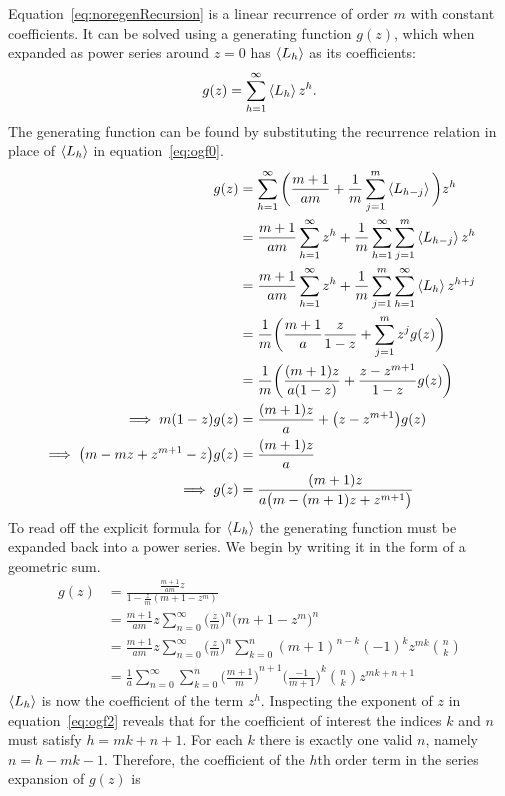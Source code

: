 Equation~\ref{eq:noregenRecursion} is a linear recurrence of order $m$ with constant coefficients. It can be solved using a generating function $g(z)$, which when expanded as power series around $z=0$ has $\left\langle L_h \right\rangle$ as its coefficients:
\begin{align}
	g(z) = \sum_{h=1}^{\infty} \left\langle L_h \right\rangle z^h\label{eq:ogf0}.
\end{align}
The generating function can be found by substituting the recurrence relation in place of $\left\langle L_h \right\rangle$ in equation~\ref{eq:ogf0}.
\begin{align}
	g(z)
		&= \sum_{h=1}^\infty\bigg(\frac{m+1}{am} + \frac{1}{m}\sum_{j=1}^m \left\langle L_{h-j} \right\rangle\bigg)z^h\nonumber\\
		&= \frac{m+1}{am}\sum_{h=1}^\infty z^h + \frac{1}{m} \sum_{h=1}^\infty\sum_{j=1}^m \left\langle L_{h-j} \right\rangle z^h \nonumber\\
		&= \frac{m+1}{am}\sum_{h=1}^\infty z^h + \frac{1}{m} \sum_{j=1}^m\sum_{h=1}^\infty \left\langle L_h \right\rangle z^{h+j} \nonumber\\
		&= \frac{1}{m}\bigg(\frac{m+1}{a}\frac{z}{1-z} + \sum_{j=1}^m z^j g(z)\bigg)\nonumber\\
		&= \frac{1}{m}\bigg(\frac{(m+1)z}{a(1-z)} + \frac{z - z^{m+1}}{1-z} g(z)\bigg)\nonumber\\
	\implies m(1-z)g(z) &= \frac{(m+1)z}{a} + \big(z - z^{m+1}\big)g(z)\nonumber\\
	\implies \big(m - mz + z^{m+1} - z\big)g(z) &= \frac{(m+1)z}{a}\nonumber\\
	\implies g(z) &= \frac{(m+1)z}{a\big(m - (m+1)z + z^{m+1}\big)}\label{eq:ogf1}
\end{align}
To read off the explicit formula for $\left\langle L_h \right\rangle$ the generating function must be expanded back into a power series. We begin by writing it in the form of a geometric sum.
\begin{align}
	g(z) &= \frac{\frac{m+1}{am}z}{1 - \frac{z}{m}(m+1-z^m)}\nonumber\\
	&= \frac{m+1}{am}z \sum_{n=0}^\infty {\Big(\frac{z}{m}\Big)}^n {\big(m+1-z^m\big)}^n\nonumber\\
	&= \frac{m+1}{am}z \sum_{n=0}^\infty {\Big(\frac{z}{m}\Big)}^n \sum_{k=0}^{n} {(m+1)}^{n-k}{(-1)}^k z^{mk} {n \choose k}\nonumber\\
	&= \frac{1}{a} \sum_{n=0}^\infty \sum_{k=0}^{n} {\Big(\frac{m+1}{m}\Big)}^{n+1} {\Big(\frac{-1}{m+1}\Big)}^k {n \choose k}z^{mk+n+1}\label{eq:ogf2}
\end{align}
$\left\langle L_h \right\rangle$ is now the coefficient of the term $z^h$. Inspecting the exponent of $z$ in equation~\ref{eq:ogf2} reveals that for the coefficient of interest the indices $k$ and $n$ must satisfy $h=mk+n+1$. For each $k$ there is exactly one valid $n$, namely $n = h-mk-1$. Therefore, the coefficient of the $h$th order term in the series expansion of $g(z)$ is
